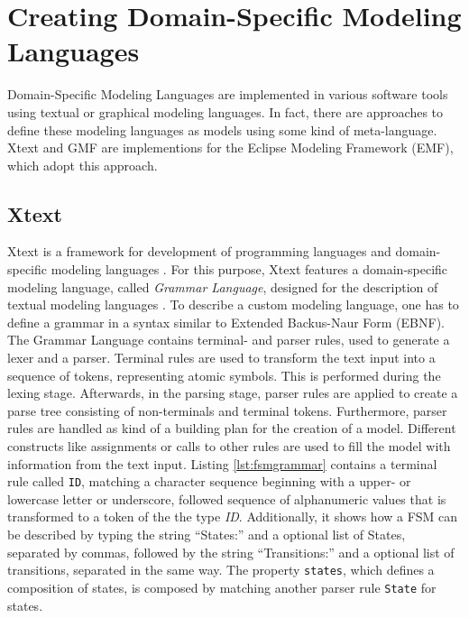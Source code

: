 \documentclass[runningheads,a4paper]{llncs}
\begin{document}
    \section{Creating Domain-Specific Modeling Languages}
    \label{section:creatingdsmls}
    Domain-Specific Modeling Languages are implemented in various software tools using textual or graphical modeling languages.
    In fact, there are approaches to define these modeling languages as models using some kind of meta-language.
    Xtext and GMF are implementions for the Eclipse Modeling Framework (EMF), which adopt this approach.
    
    \subsection{Xtext}
    Xtext is a framework for development of programming languages and domain-specific modeling languages \cite{eysholdt2010xtext}.
    For this purpose, Xtext features a domain-specific modeling language, called \emph{Grammar Language}, designed for the description of textual modeling languages \cite{xtextgrammarlang}.
    To describe a custom modeling language, one has to define a grammar in a syntax similar to Extended Backus-Naur Form (EBNF).
    The Grammar Language contains terminal- and parser rules, used to generate a lexer and a parser.
    Terminal rules are used to transform the text input into a sequence of tokens, representing atomic symbols. This is performed during the lexing stage. 
    Afterwards, in the parsing stage, parser rules are applied to create a parse tree consisting of non-terminals and terminal tokens.
    Furthermore, parser rules are handled as kind of a building plan for the creation of a model.
    Different constructs like assignments or calls to other rules are used to fill the model with information from the text input. 
    Listing \ref{lst:fsmgrammar} contains a terminal rule called \texttt{ID}, matching a character sequence beginning with a 
    upper- or lowercase letter or underscore, followed sequence of alphanumeric values that is transformed to a token of the the type 
    \textit{ID}. Additionally, it shows how a FSM can be described by typing the string ``States:'' and a optional list of States, separated by commas,
    followed by the string ``Transitions:'' and a optional list of transitions, separated in the same way.
    The property \texttt{states}, which defines a composition of states, is composed by matching another parser rule \texttt{State} for states.
\end{document}
